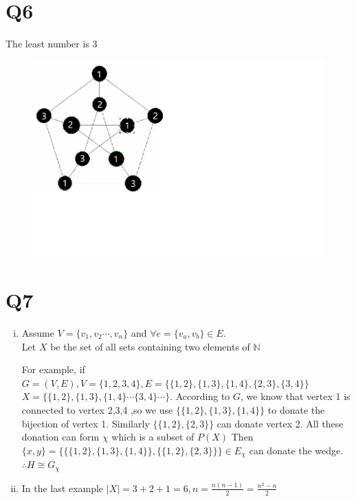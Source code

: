 \documentclass[12pt]{article}
\begin{document}
\section{Q6}
The least number is 3
\begin{figure}[H]
\centering
\includegraphics[scale=0.5]{P4.jpg}
\end{figure} 
\section{Q7}
\begin{enumerate}[(i)]
\item Assume $V=\{v_1,v_2\cdots,v_n\}$ and $\forall e=\{v_a,v_b\}\in E$. 
\\Let $X$ be the set of all sets containing two elements of $\mathbb{N}$
\par For example, if $G=(V,E),V=\{1,2,3,4\},E=\{\{1,2\},\{1,3\},\{1,4\},\{2,3\},\{3,4\}\}$
\\$X=\{\{1,2\},\{1,3\},\{1,4\}\cdots\{3,4\}\cdots\}$. According to $G$, we know that vertex 1 is connected to vertex 2,3,4
,so we use $\{\{1,2\},\{1,3\},\{1,4\}\}$ to donate the bijection of vertex 1. Similarly $\{\{1,2\},\{2,3\}\}$ can donate vertex 2. All these donation can form $\chi$ which is a subset of $P(X)$ Then $\{x,y\}=\{\{\{1,2\},\{1,3\},\{1,4\}\},\{\{1,2\},\{2,3\}\}\}\in E_{\chi}$ can donate the wedge. $\therefore H\cong G_{\chi}$   
\item In the last example $|X|=3+2+1=6,n=\frac{n(n-1)}{2}=\frac{n^2-n}{2}$
\end{enumerate}
\end{document}
